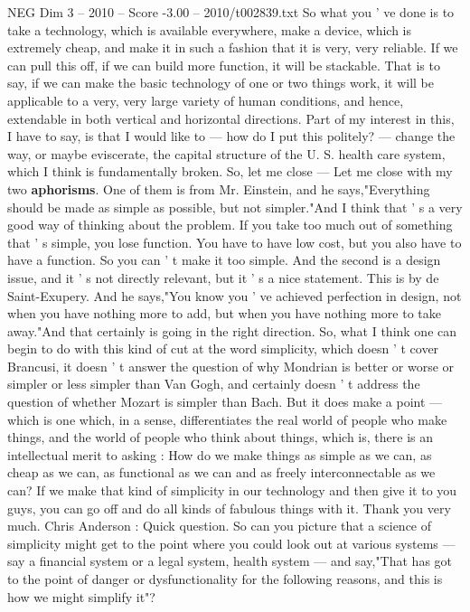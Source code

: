 \begin{textsample}{NEG Dim 3 – 2010 – Score -3.00 – 2010/t002839.txt}
So what you ' ve done is to take a technology, which is available everywhere, make a device, which is extremely cheap, and make it in such a fashion that it is very, very reliable.
If we can pull this off, if we can build more function, it will be stackable.
That is to say, if we can make the basic technology of one or two things work, it will be applicable to a very, very large variety of human conditions, and hence, extendable in both vertical and horizontal directions.
Part of my interest in this, I have to say, is that I would like to — how do I put this politely? — change the way, or maybe eviscerate, the capital structure of the U.
S. health care system, which I think is fundamentally broken.
So, let me close — Let me close with my two \textbf{aphorisms}.
One of them is from Mr.
Einstein, and he says,"Everything should be made as simple as possible, but not simpler."And I think that ' s a very good way of thinking about the problem.
If you take too much out of something that ' s simple, you lose function.
You have to have low cost, but you also have to have a function.
So you can ' t make it too simple.
And the second is a design issue, and it ' s not directly relevant, but it ' s a nice statement.
This is by de Saint-Exupery.
And he says,"You know you ' ve achieved perfection in design, not when you have nothing more to add, but when you have nothing more to take away."And that certainly is going in the right direction.
So, what I think one can begin to do with this kind of cut at the word simplicity, which doesn ' t cover Brancusi, it doesn ' t answer the question of why Mondrian is better or worse or simpler or less simpler than Van Gogh, and certainly doesn ' t address the question of whether Mozart is simpler than Bach.
But it does make a point — which is one which, in a sense, differentiates the real world of people who make things, and the world of people who think about things, which is, there is an intellectual merit to asking : How do we make things as simple as we can, as cheap as we can, as functional as we can and as freely interconnectable as we can?
If we make that kind of simplicity in our technology and then give it to you guys, you can go off and do all kinds of fabulous things with it.
Thank you very much.
Chris Anderson : Quick question.
So can you picture that a science of simplicity might get to the point where you could look out at various systems — say a financial system or a legal system, health system — and say,"That has got to the point of danger or dysfunctionality for the following reasons, and this is how we might simplify it"?

\end{textsample}
